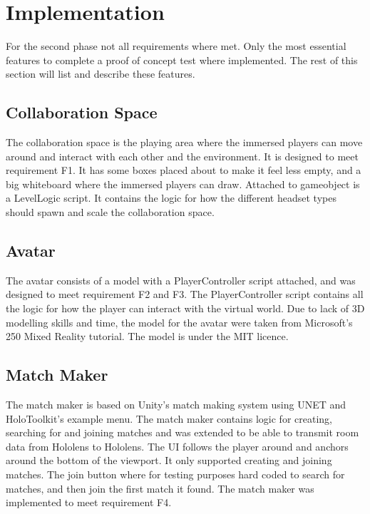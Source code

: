    \section{Implementation} %
    For the second phase not all requirements where met. Only the most essential features to complete a proof of concept test where implemented. The rest of this section will list and describe these features.
    
        \subsection{Collaboration Space}
        The collaboration space is the playing area where the immersed players can move around and interact with each other and the environment. It is designed to meet requirement F1. It has some boxes placed about to make it feel less empty, and a big whiteboard where the immersed players can draw. Attached to gameobject is a LevelLogic script. It contains the logic for how the different headset types should spawn and scale the collaboration space. %
        
        \subsection{Avatar}
        The avatar consists of a model with a PlayerController script attached, and was designed to meet requirement F2 and F3. The PlayerController script contains all the logic for how the player can interact with the virtual world. Due to lack of 3D modelling skills and time, the model for the avatar were taken from Microsoft's 250 Mixed Reality tutorial. The model is under the MIT licence. %
    
        \subsection{Match Maker}
        The match maker is based on Unity's match making system using UNET and HoloToolkit's example menu. The match maker contains logic for creating, searching for and joining matches and was extended to be able to transmit room data from Hololens to Hololens. The UI follows the player around and anchors around the bottom of the viewport. It only supported creating and joining matches. The join button where for testing purposes hard coded to search for matches, and then join the first match it found. The match maker was implemented to meet requirement F4. %
        
